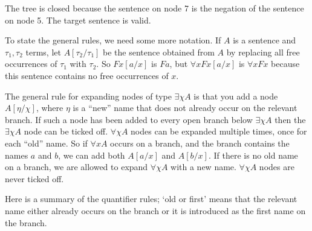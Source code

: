 \medskip
\begin{center} 
\end{center}

\medskip\noindent%
The tree is closed because the sentence on node 7 is the negation of the
sentence on node 5. The target sentence is valid.

To state the general rules, we need some more notation. If $A$ is a sentence and $\tau_{1}, \tau_{2}$ terms, let $A[\tau_{2}/\tau_{1}]$ be the sentence
obtained from $A$ by replacing all free occurrences of $\tau_{1}$ with $\tau_{2}$. So
$Fx[a/x]$ is $Fa$, but $\forall x Fx[a/x]$ is $\forall x Fx$ because this
sentence contains no free occurrences of $x$.

The general rule for expanding nodes of type $\exists \chi A$ is that you add a
node $A[\eta/\chi]$, where $\eta$ is a ``new'' name that does not already occur
on the relevant branch. If such a node has been added to every open branch below
$\exists \chi A$ then the $\exists \chi A$ node can be ticked off.
$\forall \chi A$ nodes can be expanded multiple times, once for each ``old''
name. So if $\forall x A$ occurs on a branch, and the branch contains the names
$a$ and $b$, we can add both $A[a/x]$ and $A[b/x]$. If there is no old name
on a branch, we are allowed to expand $\forall \chi A$ with a new name.
$\forall \chi A$ nodes are never ticked off.

Here is a summary of the quantifier rules; `old or first' means that the
relevant name either already occurs on the branch or it is introduced as the
first name on the branch.

\bigskip

